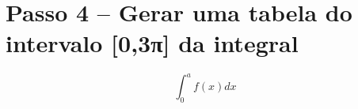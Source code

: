 \documentclass[11pt]{article}
\begin{document}
    \begin{center}
    \end{center}
    { \hspace*{\fill} \\}
    
    \begin{center}
    \end{center}
    { \hspace*{\fill} \\}
    
    \begin{center}
    \end{center}
    { \hspace*{\fill} \\}
    
    \begin{center}
    \end{center}
    { \hspace*{\fill} \\}
    
    \hypertarget{passo-4-gerar-uma-tabela-do-intervalo-03ux3c0-da-integral}{%
\section{Passo 4 -- Gerar uma tabela do intervalo {[}0,3π{]} da
integral}\label{passo-4-gerar-uma-tabela-do-intervalo-03ux3c0-da-integral}}

    \begin{equation*}
\int_{0}^{a} f(x) dx
\end{equation*}
\end{document}
